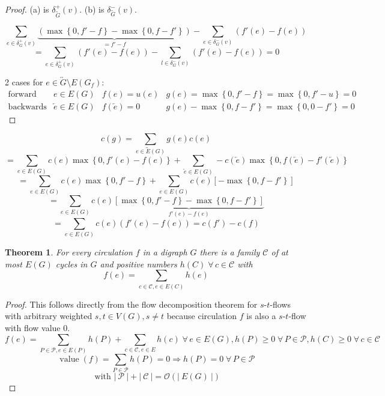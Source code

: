 \documentclass{article}
\newtheorem{theorem}{Theorem}
\newcommand{\card}[1]{\left|\:\!#1\:\!\right|}
\newcommand{\set}[1]{\left\{#1\right\}}
\newcommand{\flow}[2]{$#1$-$#2$-flow}
\newcommand{\fall}{\;\forall\,}
\begin{document}
\begin{proof}
  (a) is $\delta^+_{\overleftrightarrow{G}}(v)$. (b) is $\delta^-_{\overleftrightarrow{G}}(v)$.

  \[
    \sum_{e \in \delta^+_G(v)} \underbrace{\left(\max\set{0, f' - f} - \max\set{0, f - f'}\right)}_{= f' - f} - \sum_{e \in \delta^-_G(v)} \left(f'(e) - f(e)\right)
  \] \[
      = \sum_{e \in \delta^+_G(v)} \left(f'(e) - f(e)\right) - \sum_{l \in \delta^-_G(v)} \left(f'(e) - f(e)\right)
      = 0
  \]

  2 cases for $e \in \overleftrightarrow{G} \setminus E(G_f)$:
  \[
    \begin{array}{llll}
      \text{forward edge} & e \in E(G) & f(e) = u(e) & g(e) = \max\set{0, f' - f} = \max\set{0, f' - u} = 0 \\
      \text{backwards edge} & \overleftarrow{e} \in E(G) & f(\overleftarrow{e}) = 0 & g(e) - \max\set{0, f - f'} = \max\set{0, 0 - f'} = 0
    \end{array}
  \]
\end{proof}

\begin{equation*}
  c(g) = \sum_{e \in \overleftrightarrow{E}(G)} g(e) c(e)
\end{equation*} \begin{equation*}
    = \sum_{e \in E(G)} c(e) \max\set{0, f'(e) - f(e)} + \sum_{\overleftarrow{e} \in E(G)} -c(\overleftarrow{e}) \max\set{0, f(\overleftarrow{e}) - f'(\overleftarrow{e})}
\end{equation*} \begin{equation*}
    = \sum_{e \in E(G)} c(e) \max\set{0, f' - f} + \sum_{e \in E(G)} c(e) [-\max\set{0, f - f'}]
\end{equation*} \begin{equation*}
    = \sum_{e \in E(G)} c(e) \underbrace{
      \left[\max\set{0, f'-f} - \max\set{0, f - f'} \right]
    }_{f'(e) - f(e)}
\end{equation*} \begin{equation*}
    = \sum_{e \in E(G)} c(e) \left(f'(e) - f(e)\right) = c(f') - c(f)
\end{equation*}

\begin{theorem}\label{proposition-5.2}
  For every circulation $f$ in a digraph $G$ there is a family $\mathcal{C}$ of at most $E(G)$ cycles in $G$ and positive numbers $h(C) \fall c \in \mathcal{C}$ with
  \[
    f(e) = \sum_{c \in \mathcal{C}, e \in E(C)} h(e)
  \]
\end{theorem}

\begin{proof}
  This follows directly from the flow decomposition theorem for \flow sts with arbitrary weighted $s,t \in V(G), s \neq t$ because circulation $f$ is also a \flow st with flow value $0$.
  \[
    f(e) = \sum_{P \in \mathcal{P}, e \in E(P)} h(P) + \sum_{c \in \mathcal{C}, e \in E} h(c)
      \fall e \in E(G), h(P) \geq 0 \fall P \in \mathcal{P}, h(C) \geq 0 \fall c \in \mathcal{C}
  \] \[
    \operatorname{value}(f) = \sum_{P \in \mathcal{P}} h(P) = 0 \Rightarrow h(P) = 0 \fall P \in \mathcal{P}
  \] \[
    \text{ with } \card{\mathcal{P}} + \card{\mathcal{C}} = \mathcal{O}(\card{E(G)})
  \]
\end{proof}
\end{document}
